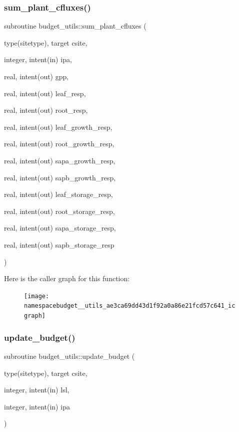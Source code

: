 \subsubsection{\texorpdfstring{sum\+\_\+plant\+\_\+cfluxes()}{sum\_plant\_cfluxes()}}
{\footnotesize\ttfamily subroutine budget\+\_\+utils\+::sum\+\_\+plant\+\_\+cfluxes (\begin{DoxyParamCaption}\item[{type(sitetype), target}]{csite,  }\item[{integer, intent(in)}]{ipa,  }\item[{real, intent(out)}]{gpp,  }\item[{real, intent(out)}]{leaf\+\_\+resp,  }\item[{real, intent(out)}]{root\+\_\+resp,  }\item[{real, intent(out)}]{leaf\+\_\+growth\+\_\+resp,  }\item[{real, intent(out)}]{root\+\_\+growth\+\_\+resp,  }\item[{real, intent(out)}]{sapa\+\_\+growth\+\_\+resp,  }\item[{real, intent(out)}]{sapb\+\_\+growth\+\_\+resp,  }\item[{real, intent(out)}]{leaf\+\_\+storage\+\_\+resp,  }\item[{real, intent(out)}]{root\+\_\+storage\+\_\+resp,  }\item[{real, intent(out)}]{sapa\+\_\+storage\+\_\+resp,  }\item[{real, intent(out)}]{sapb\+\_\+storage\+\_\+resp }\end{DoxyParamCaption})}

Here is the caller graph for this function\+:
\nopagebreak
\begin{figure}[H]
\begin{center}
\leavevmode
\texttt{[image: namespacebudget\_\_utils\_ae3ca69dd43d1f92a0a86e21fcd57c641\_icgraph]}
\end{center}
\end{figure}
\mbox{\label{namespacebudget__utils_ac092645bc3b3bd0dcfa2cdedc2451c58}} 
\subsubsection{\texorpdfstring{update\+\_\+budget()}{update\_budget()}}
{\footnotesize\ttfamily subroutine budget\+\_\+utils\+::update\+\_\+budget (\begin{DoxyParamCaption}\item[{type(sitetype), target}]{csite,  }\item[{integer, intent(in)}]{lsl,  }\item[{integer, intent(in)}]{ipa }\end{DoxyParamCaption})}

